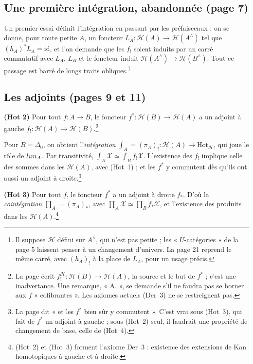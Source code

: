 \documentclass[11pt,a4paper]{article}
\begin{document}
\subsection*{Une première intégration, abandonnée (page 7)}

Un premier essai définit l'intégration en passant par les préfaisceaux : on
se donne, pour toute petite $A$, un foncteur $L_A : \mathcal H(A) \to
\mathcal H(A^{\wedge})$ tel que $(h_A)^{*} L_A = \mathrm{id}$, et l'on
demande que les $f_{!}$ soient induits par un carré commutatif avec
$L_A$, $L_B$ et le foncteur induit $\mathcal H(A^{\wedge}) \to
\mathcal H(B^{\wedge})$. Tout ce passage est barré de longs traits
obliques.\footnote{Il suppose $\mathcal H$ défini sur $A^{\wedge}$, qui
n'est pas petite ; les « $U$-catégories » de la page 5 laissent penser à un
changement d'univers. La page 21 reprend le même carré, avec $(h_A)_{!}$ à
la place de $L_A$, pour un usage précis.}

\subsection*{Les adjoints (pages 9 et 11)}

\textbf{(Hot 2)} Pour tout $f : A \to B$, le foncteur $f^{*} : \mathcal H(B)
\to \mathcal H(A)$ a un adjoint à gauche $f_{!} : \mathcal H(A) \to
\mathcal H(B)$.\footnote{La page écrit $f^{\mathcal H}_{!} : \mathcal H(B) \to
\mathcal H(A)$, la source et le but de $f^{*}$ ; c'est une inadvertance.
Une remarque, « A. », se demande s'il ne faudra pas se borner aux $f$
« cofibrantes ». Les axiomes actuels (Der~3) ne se restreignent pas.}

Pour $B = \Delta_0$, on obtient l'\emph{intégration} $\int_A =
(\pi_A)_{!} : \mathcal H(A) \to \mathrm{Hot}_{\mathcal H}$, qui joue le rôle de
$\varinjlim_A$. Par transitivité, $\int_A \mathcal X \simeq \int_B
f_{!}\mathcal X$. L'existence des $f_{!}$ implique celle des sommes dans les
$\mathcal H(A)$, avec (Hot~1) ; et les $f^{*}$ y commutent dès qu'ils ont
aussi un adjoint à droite.\footnote{La page dit « et les $f^{*}$ bien sûr y
commutent ». C'est vrai sous (Hot~3), qui fait de $f^{*}$ un adjoint à
gauche ; sous (Hot~2) seul, il faudrait une propriété de changement de base,
celle de (Hot~4).}

\textbf{(Hot 3)} Pour tout $f$, le foncteur $f^{*}$ a un adjoint à droite
$f_{*}$. D'où la \emph{cointégration} $\prod_A = (\pi_A)_{*}$, avec $\prod_A
\mathcal X \simeq \prod_B f_{*}\mathcal X$, et l'existence des produits dans
les $\mathcal H(A)$.\footnote{(Hot~2) et (Hot~3) forment l'axiome Der~3 :
existence des extensions de Kan homotopiques à gauche et à droite.}
\end{document}
